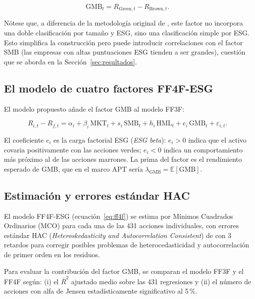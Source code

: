 \documentclass[12pt, a4paper]{article}
\begin{document}
\begin{equation}
  \label{eq:gmb}
  \mathrm{GMB}_t = R_{\text{Green},t} - R_{\text{Brown},t}.
\end{equation}

N\'otese que, a diferencia de la metodolog\'ia original de \textcite{famafrench1993},
este factor no incorpora una doble clasificaci\'on por tama\~no y ESG, sino una
clasificaci\'on simple por ESG. Esto simplifica la construcci\'on pero puede introducir
correlaciones con el factor SMB (las empresas con altas puntuaciones ESG tienden a ser
grandes), cuesti\'on que se aborda en la Secci\'on~\ref{sec:resultados}.

\subsection{El modelo de cuatro factores FF4F-ESG}
\label{subsec:ff4f}

El modelo propuesto a\~nade el factor GMB al modelo FF3F:

\begin{equation}
  \label{eq:ff4f}
  R_{i,t} - R_{f,t} = \alpha_i + \beta_i\,\mathrm{MKT}_t
    + s_i\,\mathrm{SMB}_t + h_i\,\mathrm{HML}_t
    + e_i\,\mathrm{GMB}_t + \varepsilon_{i,t}.
\end{equation}

El coeficiente $e_i$ es la carga factorial ESG (\textit{ESG beta}): $e_i > 0$
indica que el activo covaria positivamente con las acciones verdes; $e_i < 0$
indica un comportamiento m\'as pr\'oximo al de las acciones marrones. La prima del
factor es el rendimiento esperado de GMB, que en el marco APT ser\'ia
$\lambda_{\mathrm{GMB}} = \mathbb{E}[\mathrm{GMB}]$.

\subsection{Estimaci\'on y errores est\'andar HAC}
\label{subsec:estimacion}

El modelo FF4F-ESG (ecuaci\'on~\ref{eq:ff4f}) se estima por M\'inimos Cuadrados
Ordinarios (MCO) para cada una de las 431 acciones individuales, con errores est\'andar
HAC (\textit{Heteroskedasticity and Autocorrelation Consistent}) de
\textcite{neweywest1987} con 3 retardos para corregir posibles problemas de
heterocedasticidad y autocorrelaci\'on de primer orden en los residuos.

Para evaluar la contribuci\'on del factor GMB, se comparan el modelo FF3F y el FF4F
seg\'un: (i) el $\bar{R}^2$ ajustado medio sobre las 431 regresiones y (ii) el n\'umero
de acciones con alfa de Jensen estad\'isticamente significativo al 5\,\%.
\end{document}
